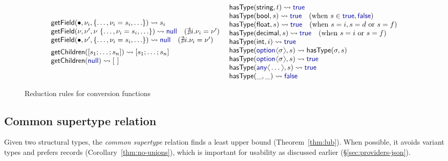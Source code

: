 \documentclass[10pt,preprint,blind,clearpagebib]{sigplanconf}
\newcommand{\langl}{\begin{picture}(4.5,7)
\put(1.1,2.5){\rotatebox{60}{\line(1,0){5.5}}}
\put(1.1,2.5){\rotatebox{300}{\line(1,0){5.5}}}
\end{picture}}
\newcommand{\rangl}{\begin{picture}(4.5,7)
\put(.9,2.5){\rotatebox{120}{\line(1,0){5.5}}}
\put(.9,2.5){\rotatebox{240}{\line(1,0){5.5}}}
\end{picture}}
\newcommand{\kvd}[1]{\textnormal{\textcolor{kvdclr}{\sffamily #1}}}
\newcommand{\ident}[1]{\textnormal{\sffamily #1}}
\newcommand{\reduce}{\rightsquigarrow}
\begin{document}
\begin{figure}
\begin{equation*}
\begin{array}{l}
\ident{getField}(\bullet, \nu_i, \{\ldots, \nu_i=s_i, \ldots\}) \reduce s_i\\
\ident{getField}(\nu,\nu', \nu~\{\ldots, \nu_i=s_i, \ldots\}) \reduce \kvd{null}\quad(\nexists i.\nu_i=\nu' )\\
\ident{getField}(\bullet, \nu', \{\ldots, \nu_i=s_i, \ldots\}) \reduce \kvd{null}\quad(\nexists i.\nu_i=\nu' )
\\[0.5em]
\ident{getChildren}([s_1; \ldots; s_n]) \reduce [s_1; \ldots; s_n]  \\  
\ident{getChildren}(\kvd{null}) \reduce [~] 
\end{array}
~
\begin{array}{l}
\ident{hasType}(\ident{string}, t) \reduce \kvd{true} \\
\ident{hasType}(\ident{bool}, s) \reduce \kvd{true} \quad(\textnormal{when}~s\in{\kvd{true},\kvd{false}} )\\
\ident{hasType}(\ident{float}, s) \reduce \kvd{true} \quad(\textnormal{when}~s=i, s=d ~\textnormal{or}~ s=f) \\
\ident{hasType}(\ident{decimal}, s) \reduce \kvd{true} \quad(\textnormal{when}~s=i ~\textnormal{or}~ s=f) \\
\ident{hasType}(\ident{int}, i) \reduce \kvd{true}\\
\ident{hasType}(\kvd{option}\langl\sigma\rangl, s) \reduce \ident{hasType}(\sigma,s) \\
\ident{hasType}(\kvd{option}\langl\sigma\rangl, s) \reduce \kvd{true} \\
\ident{hasType}(\kvd{any}\langl\ldots\rangl, s) \reduce \kvd{true} \\
\ident{hasType}(\_, \_) \reduce \kvd{false} \\
\end{array}
\end{equation*}

\caption{Reduction rules for conversion functions}
\label{fig:op-conversions}
\end{figure}


\subsection{Common supertype relation}
\label{sec:inference-commonsuper}

Given two structural types, the \emph{common supertype} relation finds a least upper bound
(Theorem~\ref{thm:lub}). When possible, it avoids variant types and prefers records 
(Corollary~\ref{thm:no-unions}), which is important for usability as discussed earlier
(\S\ref{sec:providers-json}). 
\end{document}
